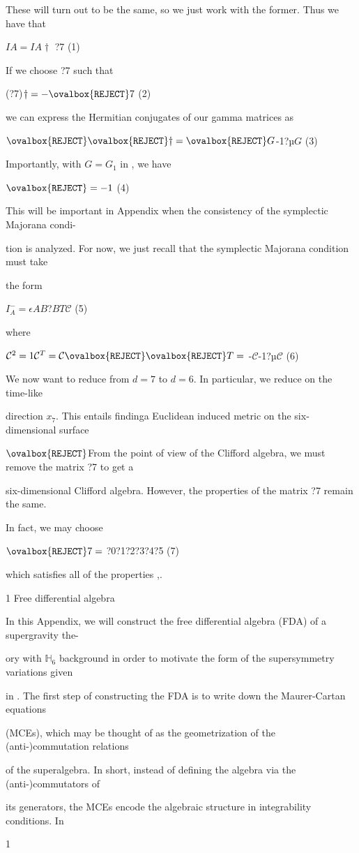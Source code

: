 \documentclass[a4paper,12pt]{article}
\begin{document}
These will turn out to be the same, so we just work with the former. Thus we have that
\begin{center}
$ I A=I A\dagger$ ?7   (1)
\end{center}
If we choose ?7 such that
\begin{center}
(?7)$\dagger =-\ovalbox{\tt\small REJECT} 7$   (2)
\end{center}
we can express the Hermitian conjugates of our gamma matrices as
\begin{center}
$\ovalbox{\tt\small REJECT}\ovalbox{\tt\small REJECT}\dagger=\ovalbox{\tt\small REJECT} G$-1?µ$G$   (3)
\end{center}
Importantly, with $G=G_{1}$ in , we have
\begin{center}
$\ovalbox{\tt\small REJECT}=-1$   (4)
\end{center}
This will be important in Appendix when the consistency of the symplectic Majorana condi-

tion is analyzed. For now, we just recall that the symplectic Majorana condition must take

the form
\begin{center}
$I_{A}^{-} = \epsilon AB$?$BT \mathcal{C}$   (5)
\end{center}
where
\begin{center}
$\mathcal{C}^{2}=1 \mathcal{C}^{T}=\mathcal{C} \ovalbox{\tt\small REJECT}\ovalbox{\tt\small REJECT} T=$ -$\mathcal{C}$-1?µ$\mathcal{C}$   (6)
\end{center}
We now want to reduce from $d = 7$ to $d = 6$. In particular, we reduce on the time-like

direction $x_{7}$. This entails findinga Euclidean induced metric on the six-dimensional surface

$\ovalbox{\tt\small REJECT}$From the point of view of the Clifford algebra, we must remove the matrix ?7 to get a

six-dimensional Clifford algebra. However, the properties of the matrix ?7 remain the same.

In fact, we may choose
\begin{center}
$\ovalbox{\tt\small REJECT} 7=$ ?0?1?2?3?4?5   (7)
\end{center}
which satisfies all of the properties ,.

1 Free differential algebra

In this Appendix, we will construct the free differential algebra (FDA) of a supergravity the-

ory with $\mathbb{H}_{6}$ background in order to motivate the form of the supersymmetry variations given

in . The first step of constructing the FDA is to write down the Maurer-Cartan equations

(MCEs), which may be thought of as the geometrization of the (anti-)commutation relations

of the superalgebra. In short, instead of defining the algebra via the (anti-)commutators of

its generators, the MCEs encode the algebraic structure in integrability conditions. In

1
\end{document}
